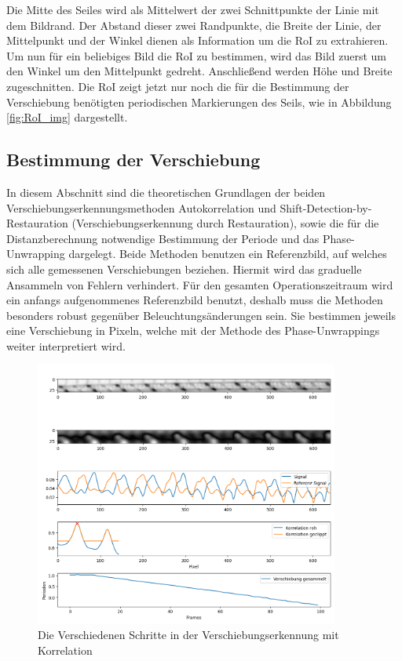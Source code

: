 \documentclass[10pt,a4paper]{scrarticle}
\begin{document}
		Die Mitte des Seiles wird als Mittelwert der zwei Schnittpunkte der Linie mit dem Bildrand. Der Abstand dieser zwei Randpunkte, die Breite der Linie, der Mittelpunkt und der Winkel dienen als Information um die RoI zu extrahieren.
		Um nun für ein beliebiges Bild die RoI zu bestimmen, wird das Bild zuerst um den Winkel um den Mittelpunkt gedreht. Anschließend werden Höhe und Breite zugeschnitten. Die RoI zeigt jetzt nur noch die für die Bestimmung der Verschiebung benötigten periodischen Markierungen des Seils, wie in Abbildung \ref{fig:RoI_img} dargestellt. 
		
		
	\subsection{Bestimmung der Verschiebung}
	In diesem Abschnitt sind die theoretischen Grundlagen der beiden Verschiebungserkennungsmethoden Autokorrelation und Shift-Detection-by-Restauration (Verschiebungserkennung durch Restauration), sowie die für die Distanzberechnung notwendige Bestimmung der Periode und das Phase-Unwrapping dargelegt.
	Beide Methoden benutzen ein Referenzbild, auf welches sich alle gemessenen Verschiebungen beziehen. Hiermit wird das graduelle Ansammeln von Fehlern verhindert. Für den gesamten Operationszeitraum wird ein anfangs aufgenommenes Referenzbild benutzt, deshalb muss die Methoden besonders robust gegenüber Beleuchtungsänderungen sein. Sie bestimmen jeweils eine Verschiebung in Pixeln, welche mit der Methode des Phase-Unwrappings weiter interpretiert wird.

        
\begin{figure}
\includegraphics[width=10cm]{Abbildungen/Correlation_figure.png}
  \centering
  \caption{Die Verschiedenen Schritte in der Verschiebungserkennung mit Korrelation}%
  \label{fig:correlation}
\end{figure}
\end{document}
